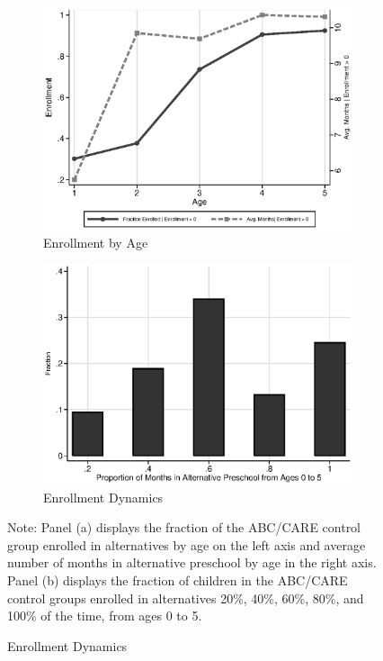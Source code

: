 \begin{figure}
\centering
\caption{Control Substitution Characteristics, ABC/CARE Control Group}\label{fig:control-sub_a}
\begin{subfigure}[h]{0.49\textwidth}
	\centering
	\caption{Enrollment by Age} \label{fig:salmonella}
		\includegraphics[width=\textwidth]{output/abccare_Valtenrollment.eps}
\end{subfigure}
\begin{subfigure}[h]{0.49\textwidth}
		\centering
		\caption{Enrollment Dynamics} \label{fig:treatsubcare_2}
		\includegraphics[width=\textwidth]{output/abccare_Vfractimes.eps}
\end{subfigure}%
\footnotesize \justify
Note: Panel (a) displays the fraction of the ABC/CARE control group enrolled in alternatives by age on the left axis and average number of months in alternative preschool by age in the right axis. Panel (b) displays the fraction of children in the ABC/CARE control groups enrolled in alternatives 20\%, 40\%, 60\%, 80\%, and 100\% of the time, from ages 0 to 5.\\
\end{figure}


